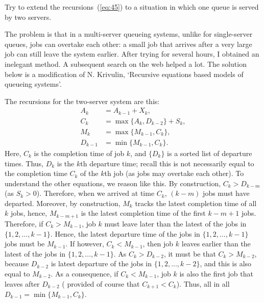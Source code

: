 \begin{extra}[\faRocket] Try to extend the recursions~(\ref{eq:45})  to a situation in which one queue is
  served by two servers.  
    \begin{hint} The problem is
      that in a multi-server queueing systems, unlike for
      single-server queues, jobs can overtake each other: a small job
      that arrives after a very large job can still leave the system
      earlier. After trying for several hours, I obtained an inelegant
      method. A subsequent search on the web helped a lot. The
      solution below is a modification of N. Krivulin, `Recursive
      equations based models of queueing systems'. 
    \end{hint}
  \begin{solution}
The recursions for the two-server system are this: 
      \begin{equation*}
        \begin{split}
          A_k &= A_{k-1} + X_k, \\
          C_k &= \max\{A_k, D_{k-2}\} + S_k,\\
          M_k &= \max\{M_{k-1}, C_k\}, \\
          D_{k-1} &= \min\{M_{k-1}, C_k\}.
        \end{split}
      \end{equation*}
      Here, $C_k$ is the completion time of job $k$, and $\{D_k\}$ is
      a sorted list of departure times. Thus, $D_k$ is the $k$th
      departure time; recall this is not necessarily equal to the
      completion time $C_k$ of the $k$th job (as jobs may overtake
      each other). To understand the other equations, we reason like
      this.  By construction, $C_k > D_{k-m}$ (as $S_k >0$).
      Therefore, when we arrived at time $C_k$, $(k-m)$ jobs must have
      departed. Moreover, by construction, $M_k$ tracks the latest
      completion time of all $k$ jobs, hence, $M_{k-m+1}$ is the latest
      completion time of the first $k-m+1$ jobs. Therefore, if
      $C_k>M_{k-1}$, job $k$ must leave later than the latest of the
      jobs in $\{1,2,\ldots, k-1\}$.  Hence, the latest departure time
      of the jobs in $\{1, 2, \ldots, k-1\}$ jobs must be
      $M_{k-1}$. If however, $C_k<M_{k-1}$, then job $k$ leaves
      earlier than the latest of the jobs in $\{1,2,\ldots, k-1\}$. As
      $C_k>D_{k-2}$, it must be that $C_k > M_{k-2}$, because
      $D_{k-2}$ is latest departure of the jobs in
      $\{1,2,\ldots, k-2\}$, and this is also equal to $M_{k-2}$. As a
      consequence, if $C_k < M_{k-1}$, job $k$ is also the first job
      that leaves after $D_{k-2}$ ( provided of course that
      $C_{k+1} < C_k$). Thus, all in all
      $D_{k-1} = \min\{M_{k-1}, C_k\}$.


\end{solution}
\end{extra}
